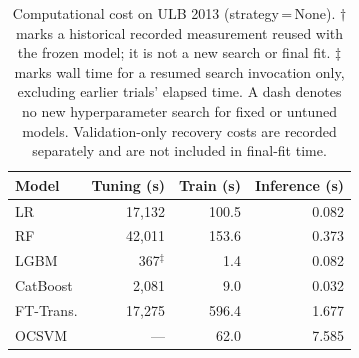 \begin{table}[ht!]
\centering
\caption{Computational cost on ULB 2013 (strategy\,=\,None). $\dagger$ marks a historical recorded measurement reused with the frozen model; it is not a new search or final fit. $\ddagger$ marks wall time for a resumed search invocation only, excluding earlier trials' elapsed time. A dash denotes no new hyperparameter search for fixed or untuned models. Validation-only recovery costs are recorded separately and are not included in final-fit time.}
\label{tab:cost_ulb}
\begin{tabular}{l r r r}
\toprule
Model & Tuning (s) & Train (s) & Inference (s) \\
\midrule
LR         & 17,132 & 100.5 & 0.082 \\
RF         & 42,011 & 153.6 & 0.373 \\
LGBM       & 367$^{\ddagger}$ & 1.4 & 0.082 \\
CatBoost   & 2,081 & 9.0 & 0.032 \\
FT-Trans.  & 17,275 & 596.4 & 1.677 \\
OCSVM      & --- & 62.0 & 7.585 \\
\bottomrule
\end{tabular}
\end{table}